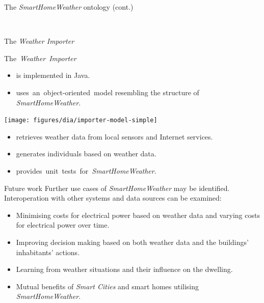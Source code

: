 \documentclass[final,hyperref={pdfpagelabels=true}]{beamer}
\begin{document}
\begin{frame}[fragile]
\begin{columns}[t]
\begin{column}{.45\textwidth}
\begin{block}{The \emph{SmartHomeWeather} ontology (cont.)}
\begin{minipage}[t]{.5\textwidth}
\begin{minipage}[t]{.87\textwidth}
~
        \end{minipage}
	\end{minipage}	
      \end{block}
      
      \begin{block}{The \emph{Weather Importer}}
        \begin{minipage}{\dimexpr.49\textwidth}
	  \mbox{The \emph{Weather Importer}}

	  \hspace{-.84em}\begin{minipage}{\dimexpr\textwidth+.84em}
	    \vspace{.4em}
	    \begin{itemize}
	      \item is implemented in Java.
	      \item \mbox{uses an object-oriented model} resembling the structure of \emph{SmartHomeWeather}.
	    \end{itemize}
	  \end{minipage}
	\end{minipage}
	\begin{minipage}{\dimexpr.41\textwidth}
	  \centering
  	  \texttt{[image: figures/dia/importer-model-simple]}
	\end{minipage}

	\vspace{.3em}
	
	\begin{itemize}
	  \item retrieves weather data from local sensors and Internet services.
	  \item generates individuals based on weather data.
	  \item \mbox{provides unit tests for \emph{SmartHomeWeather}.}
	\end{itemize}
      \end{block}

      \begin{block}{Future work}
	Further use cases of \emph{SmartHomeWeather} may be identified. Interoperation with other systems and data sources can be examined:
          \begin{itemize}
            \item Minimising costs for electrical power based on weather data and varying costs for electrical power over time.
	    \item Improving decision making based on both weather data and the buildings' inhabitants' actions.
	    \item Learning from weather situations and their influence on the dwelling.
	    \item Mutual benefits of \emph{Smart Cities} and smart homes utilising \emph{SmartHomeWeather}.
	  \end{itemize}


\end{block}
\end{column}
\end{columns}
\end{frame}
\end{document}
